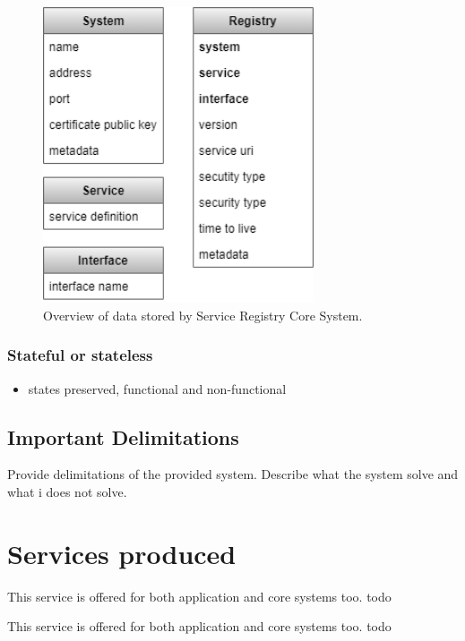 \documentclass[a4paper]{arrowhead}
\begin{document}
\begin{figure}[h!]
  \centering
  \includegraphics[width=8cm]{figures/serviceregistry_data_overview.png}
  \caption{
    Overview of data stored by Service Registry Core System.
  }
  \label{fig:model_overview}
\end{figure}

\color{red}
\subsubsection {Stateful or stateless}
\begin{itemize} 
\item states preserved, functional and non-functional
\end{itemize}  
\color{black}

\subsection{Important Delimitations}
\label{sec:delimitations}

\color{red}
Provide delimitations of the provided system. Describe what the system
solve and what i does not solve.
\color{black}

\newpage

\section{Services produced}
\label{sec:services}

This service is offered for both application and core systems too. \color{red}todo\color{black}

This service is offered for both application and core systems too.
\color{red}todo\color{black}
\end{document}
